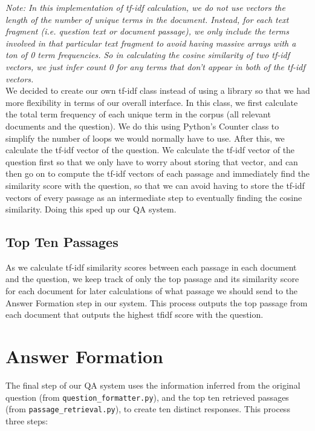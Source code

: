\documentclass{article}
\begin{document}
\textit{Note: In this implementation of tf-idf calculation, we do not use vectors the length of the number of unique terms in the document. Instead, for each text fragment (i.e. question text or document passage), we only include the terms involved in that particular text fragment to avoid having massive arrays with a ton of 0 term frequencies. So in calculating the cosine similarity of two tf-idf vectors, we just infer count 0 for any terms that don't appear in both of the tf-idf vectors.}\\

We decided to create our own tf-idf class instead of using a library so that we had more flexibility in terms of our overall interface. In this class, we first calculate the total term frequency of each unique term in the corpus (all relevant documents and the question). We do this using Python's Counter class to simplify the number of loops we would normally have to use. After this, we calculate the tf-idf vector of the question. We calculate the tf-idf vector of the question first so that we only have to worry about storing that vector, and can then go on to compute the tf-idf vectors of each passage and immediately find the similarity score with the question, so that we can avoid having to store the tf-idf vectors of every passage as an intermediate step to eventually finding the cosine similarity. Doing this sped up our QA system.

\subsection{Top Ten Passages}
As we calculate tf-idf similarity scores between each passage in each document and the question, we keep track of only the top passage and its similarity score for each document for later calculations of what passage we should send to the Answer Formation step in our system. This process outputs the top passage from each document that outputs the highest tfidf score with the question.

\section{Answer Formation}

The final step of our QA system uses the information inferred from the original question (from \texttt{question\_formatter.py}), and the top ten retrieved passages (from \texttt{passage\_retrieval.py}), to create ten distinct responses. This process three steps:
\end{document}
